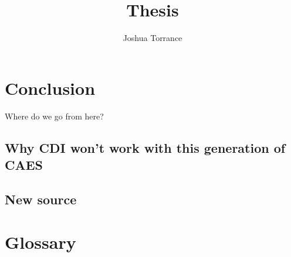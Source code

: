 \documentclass[11pt,twoside]{report}
\begin{document}
\title{Thesis}

\author{Joshua Torrance}

\maketitle






\tableofcontents



%











\chapter{Conclusion}

Where do we go from here?

\section{Why CDI won't work with this generation of CAES}

\section{New source}

\appendix

\chapter{Glossary}
\printglossary



%
\printbibliography
\end{document}

